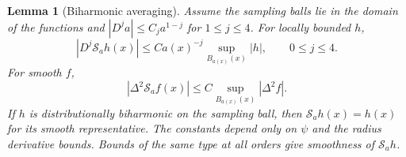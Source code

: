 \documentclass[11pt,twoside,leqno]{article}
\numberwithin{equation}{section}
\newtheorem{lemma}[theorem]{Lemma}
\theoremstyle{definition}
\theoremstyle{remark}
\begin{document}
\begin{lemma}[Biharmonic averaging]\label{lem:smoothing}
Assume the sampling balls lie in the domain of the functions and
$|D^ja|\le C_ja^{1-j}$ for $1\le j\le4$. For locally bounded $h$,
\begin{equation}\label{eq:smoothing-jets}
 |D^j\mathcal S_ah(x)|\le Ca(x)^{-j}
                    \sup_{B_{a(x)}(x)}|h|,\qquad0\le j\le4.
\end{equation}
For smooth $f$,
\begin{equation}\label{eq:smoothing-source}
 |\Delta^2\mathcal S_af(x)|
 \le C\sup_{B_{a(x)}(x)}|\Delta^2f|.
\end{equation}
If $h$ is distributionally biharmonic on the sampling ball, then
$\mathcal S_ah(x)=h(x)$ for its smooth representative.
The constants depend only on $\psi$ and the radius derivative bounds.
Bounds of the same type at all orders give smoothness of $\mathcal S_ah$.
\end{lemma}
\end{document}
